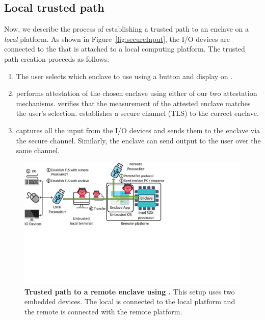 


\subsection{Local trusted path} 

Now, we describe the process of establishing a trusted path to an enclave on a \emph{local} platform. As shown in Figure~\ref{fig:secureInput}, the I/O devices are connected to the \device that is attached to a local computing platform. The trusted path creation proceeds as follows:

\begin{enumerate}
    \item[\one] The user selects which enclave to use using a button and display on \device.
    \item[\two] \device performs attestation of the chosen enclave using either of our two attestation mechanisms. \device verifies that the measurement of the attested enclave matches the user's selection. \device establishes a secure channel (TLS) to the correct enclave.
    \item[\three] \device captures all the input from the I/O devices and sends them to the enclave via the secure channel. Similarly, the enclave can send output to the user over the same channel.
\end{enumerate}
 

\begin{figure}[t]
 \centering
  \includegraphics[trim={0 8cm 14cm 0},clip,width=0.85\linewidth]{chapters/ProximiTEE/images_new/SystemDesignRemote.pdf}
 \caption[Trusted path to a remote enclave using \device]{\textbf{Trusted path to a remote enclave using \device.} This setup uses two embedded devices. The local \device is connected to the local platform and the remote \device is connected with the remote platform.}
 \label{fig:systemRemoteHost}
\end{figure}

